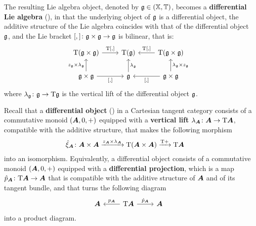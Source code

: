 \begin{content}
The resulting Lie algebra object, denoted by $\mathfrak{g}\in(\mathbb{X},\mathbb{T})$, becomes a \textbf{differential Lie algebra} (\cite[Definition~5.1 and Theorem~5.12]{lanfranchi:lie-correspondence-tangent-cats}), in that the underlying object of $\mathfrak{g}$ is a differential object, the additive structure of the Lie algebra coincides with that of the differential object $\mathfrak{g}$, and the Lie bracket $[,]\colon\mathfrak{g}\times\mathfrak{g}\to\mathfrak{g}$ is bilinear, that is:
\begin{equation*}
\begin{tikzcd}
{\T(\g\times\g)} & {\T(\g)} & {\T(\g\times\g)} \\
{\g\times\g} & \g & {\g\times\g}
\arrow["{\T[,]}", from=1-1, to=1-2]
\arrow["{\T[,]}"', from=1-3, to=1-2]
\arrow["{z_\g\times\lambda_\g}", from=2-1, to=1-1]
\arrow["{[,]}"', from=2-1, to=2-2]
\arrow["{\lambda_\g}"', from=2-2, to=1-2]
\arrow["{\lambda_\g\times z_\g}"', from=2-3, to=1-3]
\arrow["{[,]}", from=2-3, to=2-2]
\end{tikzcd}
\end{equation*}
where $\lambda_{\mathfrak{g}}\colon\mathfrak{g}\to\mathrm{T}\mathfrak{g}$ is the vertical lift of the differential object $\mathfrak{g}$.

Recall that a \textbf{differential object} (\cite[Definition~3.1]{cockett:differential-bundles}) in a Cartesian tangent category consists of a commutative monoid $({\bm{A}},0,+)$ equipped with a \textbf{vertical lift} $\lambda_{\bm{A}}\colon{\bm{A}}\to\mathrm{T}{\bm{A}}$, compatible with the additive structure, that makes the following morphism
\begin{align*}
&\hat\xi_{\bm{A}}\colon{\bm{A}}\times{\bm{A}}\xrightarrow{z_{\bm{A}}\times\lambda_{\bm{A}}}\mathrm{T}({\bm{A}}\times{\bm{A}})\xrightarrow{\mathrm{T}+}\mathrm{T}{\bm{A}}
\end{align*}
into an isomorphism. Equivalently, a differential object consists of a commutative monoid $({\bm{A}},0,+)$ equipped with a \textbf{differential projection}, which is a map $\hat p_{\bm{A}}\colon\mathrm{T}{\bm{A}}\to{\bm{A}}$ that is compatible with the additive structure of ${\bm{A}}$ and of its tangent bundle, and that turns the following diagram
\begin{equation*}
\begin{tikzcd}
\A & {\T\A} & \A
\arrow["{p_\A}"', from=1-2, to=1-1]
\arrow["{\hat p_\A}", from=1-2, to=1-3]
\end{tikzcd}
\end{equation*}
into a product diagram.
\end{content}

